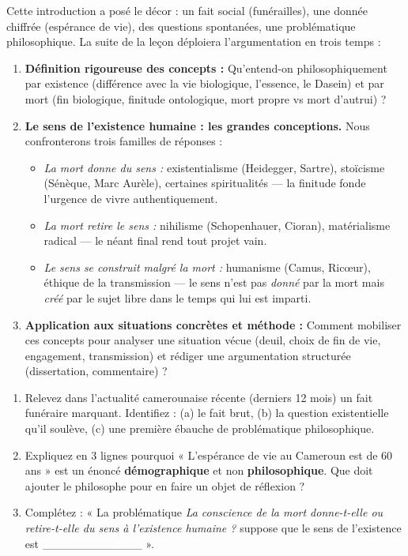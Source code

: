 \documentclass[11pt]{article}
\newcommand{\cle}[1]{{\popxbold\color{popdark}#1}}
\newcounter{popsec}
\newcounter{popsub}
\newcommand{\courssub}[1]{%
  \stepcounter{popsub}%
  \par\vspace{9pt}\noindent{\popxbold\fontsize{11.5}{13}\selectfont\color{popink}{\color{poporange}\thepopsec.\thepopsub}\hspace{6pt}#1}\par\nopagebreak\vspace{4pt}
}
\begin{document}
\courssub{Annonce du plan de la leçon}

Cette introduction a posé le décor : un fait social (funérailles), une donnée chiffrée (espérance de vie), des questions spontanées, une problématique philosophique. La suite de la leçon déploiera l'argumentation en trois temps :

\begin{enumerate}
    \item \textbf{Définition rigoureuse des concepts :} Qu'entend-on philosophiquement par \cle{existence} (différence avec la vie biologique, l'essence, le Dasein) et par \cle{mort} (fin biologique, finitude ontologique, mort propre vs mort d'autrui) ?
    \item \textbf{Le sens de l'existence humaine : les grandes conceptions.} Nous confronterons trois familles de réponses :
    \begin{itemize}
        \item \emph{La mort donne du sens :} existentialisme (Heidegger, Sartre), stoïcisme (Sénèque, Marc Aurèle), certaines spiritualités — la finitude fonde l'urgence de vivre authentiquement.
        \item \emph{La mort retire le sens :} nihilisme (Schopenhauer, Cioran), matérialisme radical — le néant final rend tout projet vain.
        \item \emph{Le sens se construit \emph{malgré} la mort :} humanisme (Camus, Ricœur), éthique de la transmission — le sens n'est pas \emph{donné} par la mort mais \emph{créé} par le sujet libre dans le temps qui lui est imparti.
    \end{itemize}
    \item \textbf{Application aux situations concrètes et méthode :} Comment mobiliser ces concepts pour analyser une situation vécue (deuil, choix de fin de vie, engagement, transmission) et rédiger une argumentation structurée (dissertation, commentaire) ?
\end{enumerate}

\begin{exercice}
\begin{enumerate}
    \item Relevez dans l'actualité camerounaise récente (derniers 12 mois) un fait funéraire marquant. Identifiez : (a) le fait brut, (b) la question existentielle qu'il soulève, (c) une première ébauche de problématique philosophique.
    \item Expliquez en 3 lignes pourquoi « L'espérance de vie au Cameroun est de 60 ans » est un énoncé \textbf{démographique} et non \textbf{philosophique}. Que doit ajouter le philosophe pour en faire un objet de réflexion ?
    \item Complétez : « La problématique \emph{La conscience de la mort donne-t-elle ou retire-t-elle du sens à l'existence humaine ?} suppose que le sens de l'existence est \_\_\_\_\_\_\_\_\_\_\_\_ ».
\end{enumerate}
\end{exercice}
\end{document}
